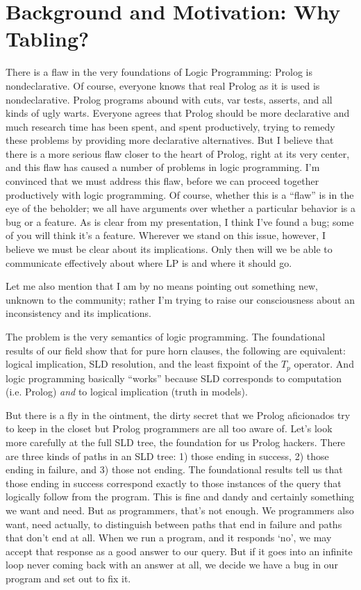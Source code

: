 \chapter{Background and Motivation: Why Tabling?}

There is a flaw in the very foundations of Logic Programming: Prolog
is nondeclarative.  Of course, everyone knows that real Prolog as it
is used is nondeclarative.  Prolog programs abound with cuts, var
tests, asserts, and all kinds of ugly warts.  Everyone agrees that
Prolog should be more declarative and much research time has been
spent, and spent productively, trying to remedy these problems by
providing more declarative alternatives.  But I believe that there is
a more serious flaw closer to the heart of Prolog, right at its very
center, and this flaw has caused a number of problems in logic
programming.  I'm convinced that we must address this flaw, before we
can proceed together productively with logic programming.  Of course,
whether this is a ``flaw'' is in the eye of the beholder; we all have
arguments over whether a particular behavior is a bug or a feature.
As is clear from my presentation, I think I've found a bug; some of
you will think it's a feature.  Wherever we stand on this issue,
however, I believe we must be clear about its implications.  Only then
will we be able to communicate effectively about where LP is and where
it should go.

Let me also mention that I am by no means pointing out something new,
unknown to the community; rather I'm trying to raise our consciousness
about an inconsistency and its implications.

The problem is the very semantics of logic programming.  The
foundational results of our field show that for pure horn clauses, the
following are equivalent: logical implication, SLD resolution, and the
least fixpoint of the $T_p$ operator.  And logic programming basically
``works'' because SLD corresponds to computation (i.e. Prolog) {\em
and} to logical implication (truth in models).

But there is a fly in the ointment, the dirty secret that we Prolog
aficionados try to keep in the closet but Prolog programmers are all
too aware of.  Let's look more carefully at the full SLD tree, the
foundation for us Prolog hackers.  There are three kinds of paths in
an SLD tree: 1) those ending in success, 2) those ending in failure,
and 3) those not ending.  The foundational results tell us that those
ending in success correspond exactly to those instances of the query
that logically follow from the program.  This is fine and dandy and
certainly something we want and need.  But as programmers, that's not
enough.  We programmers also want, need actually, to distinguish
between paths that end in failure and paths that don't end at all.
When we run a program, and it responds `no', we may accept that
response as a good answer to our query.  But if it goes into an
infinite loop never coming back with an answer at all, we decide we
have a bug in our program and set out to fix it.  

